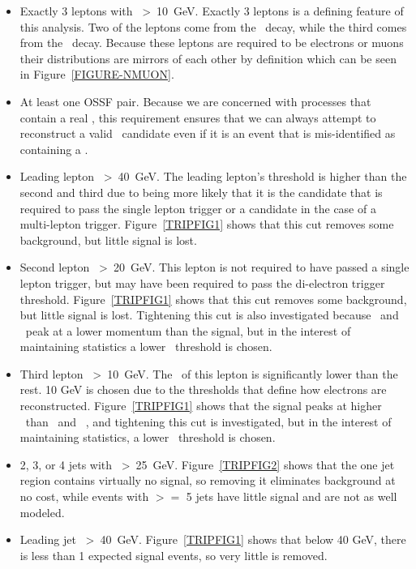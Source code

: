 \begin{itemize}
\item Exactly 3 leptons with \PT~\textgreater~10~GeV. Exactly 3 leptons is a defining feature of this analysis. Two of the leptons come from the \az~decay, while the third comes from the \at~decay. Because these leptons are required to be electrons or muons their distributions are mirrors of each other by definition which can be seen in Figure~\ref{FIGURE-NMUON}.
\item At least one OSSF pair. Because we are concerned with processes that contain a real \az, this requirement ensures that we can always attempt to reconstruct a valid \az~candidate even if it is an event that is mis-identified as containing a \az. 
\item Leading lepton \PT~\textgreater~40~GeV. The leading lepton's threshold is higher than the second and third due to being more likely that it is the candidate that is required to pass the single lepton trigger or a candidate in the case of a multi-lepton trigger. Figure~\ref{TRIPFIG1} shows that this cut removes some background, but little signal is lost.
\item Second lepton \PT~\textgreater~20~GeV. This lepton is not required to have passed a single lepton trigger, but may have been required to pass the di-electron trigger threshold. Figure~\ref{TRIPFIG1} shows that this cut removes some background, but little signal is lost. Tightening this cut is also investigated because \zjets~and \TTB~peak at a lower momentum than the signal, but in the interest of maintaining statistics a lower \PT~threshold is chosen. 
\item Third lepton \PT~\textgreater~10~GeV. The \PT~of this lepton is significantly lower than the rest. 10 GeV is chosen due to the thresholds that define how electrons are reconstructed. Figure~\ref{TRIPFIG1} shows that the signal peaks at higher \PT~than \zjets~and \TTB~, and tightening this cut is investigated, but in the interest of maintaining statistics, a lower \PT~threshold is chosen.
\item 2, 3, or 4 jets with \PT~\textgreater~25~GeV. Figure~\ref{TRIPFIG2} shows that the one jet region contains virtually no signal, so removing it eliminates background at no cost, while events with $>=$ 5 jets have little signal and are not as well modeled.
\item Leading jet \PT~\textgreater~40~GeV. Figure~\ref{TRIPFIG1} shows that below 40 GeV, there is less than 1 expected signal events, so very little is removed.

\end{itemize}

